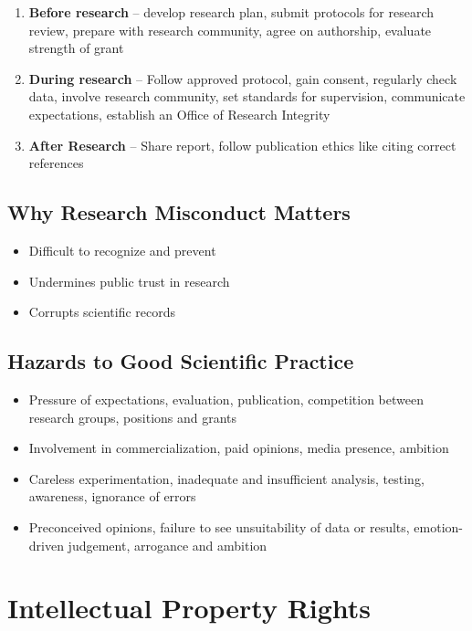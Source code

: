 \documentclass{article}
\begin{document}
\begin{enumerate}
    \item \textbf{Before research} -- develop research plan, submit protocols for research review, prepare with research community, agree on authorship, evaluate strength of grant
    \item \textbf{During research} -- Follow approved protocol, gain consent, regularly check data, involve research community, set standards for supervision, communicate expectations, establish an Office of Research Integrity
    \item \textbf{After Research} -- Share report, follow publication ethics like citing correct references
\end{enumerate}

\subsection{Why Research Misconduct Matters}

\begin{itemize}
    \item Difficult to recognize and prevent
    \item Undermines public trust in research
    \item Corrupts scientific records
\end{itemize}

\subsection{Hazards to Good Scientific Practice}

\begin{itemize}
    \item Pressure of expectations, evaluation, publication, competition between research groups, positions and grants
    \item Involvement in commercialization, paid opinions, media presence, ambition
    \item Careless experimentation, inadequate and insufficient analysis, testing, awareness, ignorance of errors
    \item Preconceived opinions, failure to see unsuitability of data or results, emotion-driven judgement, arrogance and ambition
\end{itemize}

\section{Intellectual Property Rights}
\end{document}
